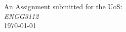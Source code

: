 \begin{titlepage}
\makeatother
{\large An Assignment submitted for the UoS:}\\[0.5cm]
{\large \emph{ENGG3112}}\\[0.5cm]
{\large \today}\\[2cm] %


 

\vfill %
\end{titlepage}